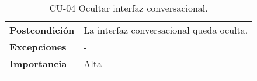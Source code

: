 \begin{longtable}[H]{@{}ll@{}}
	\begin{minipage}[t]{0.23\columnwidth}\raggedright\strut
		\textbf{Postcondición}\strut
	\end{minipage} & \begin{minipage}[t]{0.71\columnwidth}\raggedright\strut
		La interfaz conversacional queda oculta.\strut
	\end{minipage}\tabularnewline
	\begin{minipage}[t]{0.23\columnwidth}\raggedright\strut
		\textbf{Excepciones}\strut
	\end{minipage} & \begin{minipage}[t]{0.71\columnwidth}\raggedright\strut
		-\strut
	\end{minipage}\tabularnewline
	\begin{minipage}[t]{0.23\columnwidth}\raggedright\strut
		\textbf{Importancia}\strut
	\end{minipage} & \begin{minipage}[t]{0.71\columnwidth}\raggedright\strut
		Alta\strut
	\end{minipage}\tabularnewline
	\bottomrule
	\caption{CU-04 Ocultar interfaz conversacional.}
\end{longtable}